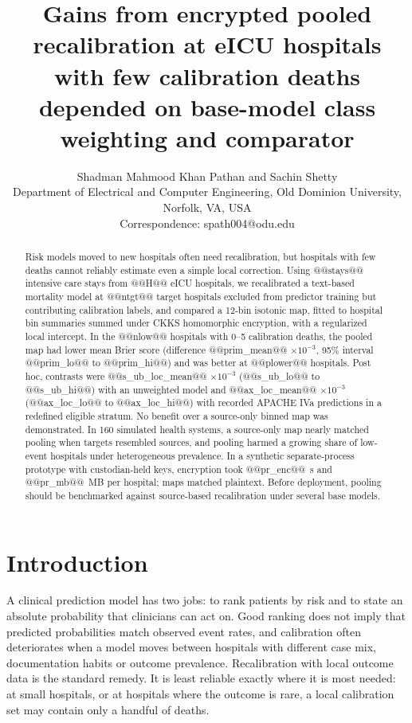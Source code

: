 \documentclass[11pt]{article}
\title{Gains from encrypted pooled recalibration at eICU hospitals with few calibration deaths depended on base-model class weighting and comparator}
\author{Shadman Mahmood Khan Pathan and Sachin Shetty\\
Department of Electrical and Computer Engineering, Old Dominion University, Norfolk, VA, USA\\
Correspondence: spath004@odu.edu}
\date{}
\begin{document}
\maketitle
\begin{abstract}
\noindent Risk models moved to new hospitals often need recalibration, but hospitals with few deaths cannot reliably estimate even a simple local correction. Using @@stays@@ intensive care stays from @@H@@ eICU hospitals, we recalibrated a text-based mortality model at @@ntgt@@ target hospitals excluded from predictor training but contributing calibration labels, and compared a 12-bin isotonic map, fitted to hospital bin summaries summed under CKKS homomorphic encryption, with a regularized local intercept. In the @@nlow@@ hospitals with 0--5 calibration deaths, the pooled map had lower mean Brier score (difference @@prim_mean@@ $\times10^{-3}$, 95\% interval @@prim_lo@@ to @@prim_hi@@) and was better at @@plower@@ hospitals. Post hoc, contrasts were @@s_ub_loc_mean@@ $\times10^{-3}$ (@@s_ub_lo@@ to @@s_ub_hi@@) with an unweighted model and @@ax_loc_mean@@ $\times10^{-3}$ (@@ax_loc_lo@@ to @@ax_loc_hi@@) with recorded APACHE IVa predictions in a redefined eligible stratum. No benefit over a source-only binned map was demonstrated. In 160 simulated health systems, a source-only map nearly matched pooling when targets resembled sources, and pooling harmed a growing share of low-event hospitals under heterogeneous prevalence. In a synthetic separate-process prototype with custodian-held keys, encryption took @@pr_enc@@~s and @@pr_mb@@~MB per hospital; maps matched plaintext. Before deployment, pooling should be benchmarked against source-based recalibration under several base models.
\end{abstract}

\section*{Introduction}
A clinical prediction model has two jobs: to rank patients by risk and to state an absolute probability that clinicians can act on. Good ranking does not imply that predicted probabilities match observed event rates, and calibration often deteriorates when a model moves between hospitals with different case mix, documentation habits or outcome prevalence\cite{r3,vancalster2019,finlayson2021}. Recalibration with local outcome data is the standard remedy\cite{r17,janssen2008}. It is least reliable exactly where it is most needed: at small hospitals, or at hospitals where the outcome is rare, a local calibration set may contain only a handful of deaths.
\end{document}

